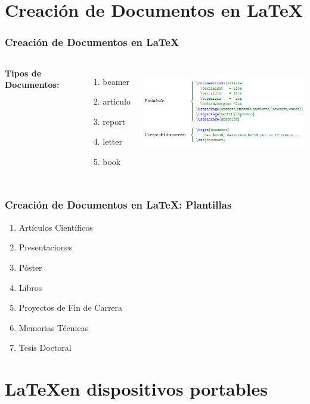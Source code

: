 \documentclass[sans serif,9pt,xcolor=dvipsnames]{beamer}%
\begin{document}
\section{Creación de Documentos en \LaTeX}
\begin{frame}
\frametitle {Creación de Documentos en \LaTeX}
\begin{center}
\begin{columns}
 \hspace{1 cm}

\textbf{Tipos de Documentos:}
\begin{enumerate}
\item beamer
\item articulo
\item report
\item letter
\item book
\end{enumerate}
\includegraphics[height=4cm]{imagenes/estDoc.PNG}  
\end{columns}
\end{center}

\end{frame}

\begin{frame}
\frametitle {Creación de Documentos en \LaTeX : Plantillas}
\begin{enumerate}
\item Artículos Científicos
\item Presentaciones
\item Póster
\item Libros
\item Proyectos de Fin de Carrera 
\item Memorias Técnicas
\item Tesis Doctoral
\end{enumerate}
\end{frame}

\section{\LaTeX  en dispositivos portables}
\end{document}
